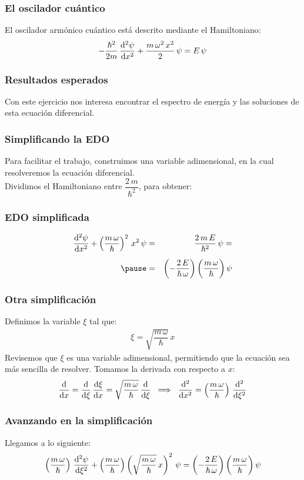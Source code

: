 \documentclass[12pt]{beamer}
\begin{document}
\begin{frame}
\frametitle{El oscilador cuántico}
El oscilador armónico cuántico está descrito mediante el Hamiltoniano:
\pause
\begin{align*}
- \dfrac{\hbar^{2}}{2 m} \, \dv[2]{\psi}{x} + \dfrac{m \, \omega^{2} \, x^{2}}{2} \, \psi = E \, \psi
\end{align*}
\end{frame}
\begin{frame}
\frametitle{Resultados esperados}
Con este ejercicio nos interesa encontrar el espectro de energía y las soluciones de esta ecuación diferencial.
\end{frame}
\begin{frame}
\frametitle{Simplificando la EDO}
Para facilitar el trabajo, construimos una variable adimensional, en la cual resolveremos la ecuación diferencial.
\\
\bigskip
\pause
Dividimos el Hamiltoniano entre $\dfrac{2 \, m}{\hbar^{2}}$, para obtener:
\end{frame}
\begin{frame}
\frametitle{EDO simplificada}
\begin{eqnarray*}
\dv[2]{\psi}{x}  + \left( \dfrac{m \, \omega}{\hbar} \right)^{2} \, x^{2} \, \psi &=&  \dfrac{2 \, m \, E}{\hbar^{2}} \, \psi =  \\[0.5em] \pause
&=& \left( - \dfrac{2 \, E}{\hbar \, \omega} \right) \bigg( \dfrac{m \, \omega}{\hbar} \bigg) \, \psi
\end{eqnarray*}
\end{frame}
\begin{frame}
\frametitle{Otra simplificación}
Definimos la variable $\xi$ tal que:
\pause
\begin{align*}
\xi = \sqrt{\dfrac{m \, \omega}{\hbar}} \, x
\end{align*}
Revisemos que $\xi$ es una variable adimensional, permitiendo que la ecuación sea más sencilla de resolver.
\pause
Tomamos la derivada con respecto a $x$:
\pause
\begin{align*}
\dv{x} = \dv{\xi} \, \dv{\xi}{x} = \sqrt{\dfrac{m \, \omega}{\hbar}} \, \dv{\xi} \hspace{0.2cm} \Longrightarrow \hspace{0.2cm} \dv[2]{x} = \left( \dfrac{m \, \omega}{\hbar} \right) \, \dv[2]{\xi}
\end{align*}
\end{frame}
\begin{frame}
\frametitle{Avanzando en la simplificación}
Llegamos a lo siguiente:
\begin{align*}
\left( \dfrac{m \, \omega}{\hbar} \right) \, \dv[2]{\psi}{\xi} + \left( \dfrac{m \, \omega}{\hbar} \right) \left( \sqrt{\dfrac{m \, \omega}{\hbar}} \, x \right)^{2} \, \psi = \left( - \dfrac{2 \, E}{\hbar \, \omega} \right) \bigg( \dfrac{m \, \omega}{\hbar} \bigg) \, \psi
\end{align*}
\end{frame}
\end{document}
